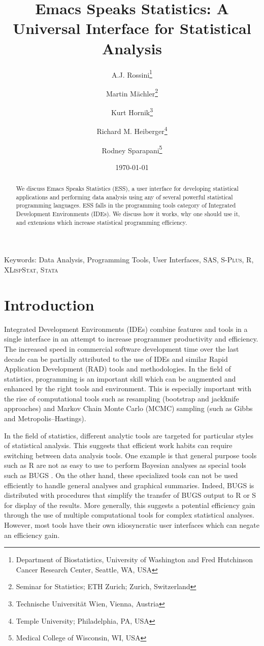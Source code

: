 \documentclass{article}
\title{Emacs Speaks Statistics: A Universal Interface for
  Statistical Analysis}
\author{A.J. Rossini\footnote{Department of Biostatistics, University
    of Washington and Fred Hutchinson Cancer Research Center, Seattle,
    WA, USA} \and Martin M{\"a}chler\footnote{Seminar for Statistics;
    ETH Zurich; Zurich, Switzerland} \and Kurt
  Hornik\footnote{Technische Universit{\"a}t Wien, Vienna, Austria}
  \and Richard M. Heiberger\footnote{Temple University; Philadelphia,
    PA, USA} \and Rodney Sparapani\footnote{Medical College of
    Wisconsin, WI, USA}}
\date{\today}
\newif\ifpdf
\newcommand*{\Splus}{\textsc{S-Plus}}
\newcommand*{\XLispStat}{\textsc{XLispStat}}
\newcommand*{\Stata}{\textsc{Stata}}
\begin{document}
\ifpdf
  \DeclareGraphicsExtensions{.jpg,.pdf,.png,.mps}
\fi


\maketitle

Keywords: Data Analysis, Programming Tools, User Interfaces, SAS,
\Splus, R, \XLispStat, \Stata

\begin{abstract}
  We discuss Emacs Speaks Statistics (ESS), a user interface for
  developing statistical applications and performing data analysis
  using any of several powerful statistical programming languages.
  ESS falls in the programming tools category of Integrated
  Development Environments (IDEs).  We discuss how it works, why one
  should use it, and extensions which increase statistical programming
  efficiency.
\end{abstract}

\section{Introduction}
\label{sec:intro}

Integrated Development Environments (IDEs) combine features and tools
in a single interface in an attempt to increase programmer
productivity and efficiency.  The increased speed in commercial
software development time over the last decade can be partially
attributed to the use of IDEs and similar Rapid Application
Development (RAD) tools and methodologies.  In the field of
statistics, programming is an important skill which can be augmented
and enhanced by the right tools and environment.  This is especially
important with the rise of computational tools such as resampling
(bootstrap and jackknife approaches) and Markov Chain Monte Carlo
(MCMC) sampling (such as Gibbs and Metropolis--Hastings).

In the field of statistics, different analytic tools are targeted for
particular styles of statistical analysis.  This suggests that
efficient work habits can require switching between data analysis
tools.  One example is that general purpose tools such as R
\citep{ihak:gent:1996} are not as easy to use to perform Bayesian
analyses as special tools such as BUGS \citep{SpieThomBest:1999}.  On
the other hand, these specialized tools can not be used efficiently to
handle general analyses and graphical summaries.  Indeed, BUGS is distributed
with procedures that simplify the transfer of BUGS output
to R or S for display of the results.  More generally, this suggests a
potential efficiency gain through the use of multiple
computational tools for complex statistical analyses.  However, most
tools have their own idiosyncratic user interfaces which can
negate an efficiency gain.
\end{document}

